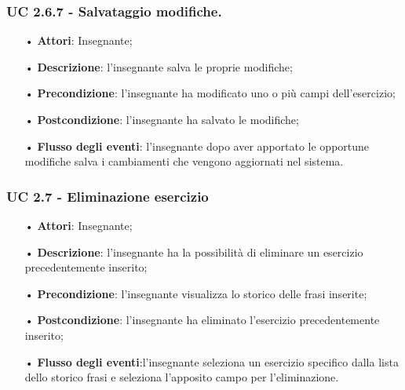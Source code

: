 \subsubsection{UC 2.6.7 - Salvataggio modifiche.} 
\begin{itemize}
	\item[•] \textbf{Attori}: Insegnante;
	\item[•] \textbf{Descrizione}: l'insegnante salva le proprie modifiche;
	\item[•] \textbf{Precondizione}: l'insegnante ha modificato uno o più campi dell'esercizio;
	\item[•] \textbf{Postcondizione}: l'insegnante ha salvato le modifiche;
	\item[•] \textbf{Flusso degli eventi}: l'insegnante dopo aver apportato le opportune modifiche salva i cambiamenti che vengono aggiornati nel sistema.
\end{itemize}


\subsubsection{UC 2.7 - Eliminazione esercizio}
\begin{itemize}
	\item[•] \textbf{Attori}: Insegnante;
	\item[•] \textbf{Descrizione}: l'insegnante ha la possibilità di eliminare un esercizio precedentemente inserito;
	\item[•] \textbf{Precondizione}: l'insegnante visualizza lo storico delle frasi inserite;
	\item[•] \textbf{Postcondizione}: l'insegnante ha eliminato l'esercizio precedentemente inserito;
	\item[•] \textbf{Flusso degli eventi}:l'insegnante seleziona un esercizio specifico dalla lista dello storico frasi e seleziona l'apposito campo per l'eliminazione.
\end{itemize}



